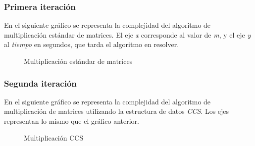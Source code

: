 \documentclass[a4paper,11pt]{article}
\begin{document}
\subsubsection{Primera iteraci\'on}
En el siguiente gr\'afico se representa la complejidad del algoritmo de
multiplicaci\'on est\'andar de matrices. El eje \emph{x} corresponde al valor
de \emph{m}, y el eje \emph{y} al \emph{tiempo} en segundos, que tarda el
algoritmo en resolver.
\renewcommand{\figurename}{Figura}
\begin{figure}[H]
	\centerline{
    }
  	\caption{Multiplicaci\'on est\'andar de matrices}
  	\label{fig:normal}
\end{figure}

\subsubsection{Segunda iteraci\'on}
En el siguiente gr\'afico se representa la complejidad del algoritmo de
multiplicaci\'on de matrices utilizando la estructura de datos \emph{CCS}. Los
ejes representan lo mismo que el gr\'afico anterior.
\begin{figure}[H]
	\centerline{
    }
  	\caption{Multiplicaci\'on CCS}
  	\label{fig:ccs}
\end{figure}
\end{document}
